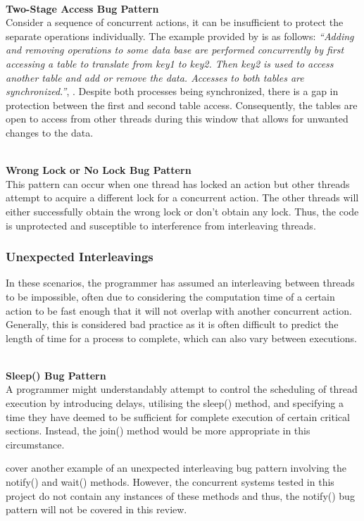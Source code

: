 \documentclass[a4paper,12pt]{article}
\begin{document}
\textbf{\\Two-Stage Access Bug Pattern}
\\Consider a sequence of concurrent actions, it can be insufficient to protect the separate operations individually. The example provided by \citeauthor{farchi03} is as follows: \textit{“Adding and removing operations to some data base are performed concurrently by first accessing a table to translate from key1 to key2. Then key2 is used to access another table and add or remove the data. Accesses to both tables are synchronized.”}, \citep{farchi03}. Despite both processes being synchronized, there is a gap in protection between the first and second table access. Consequently, the tables are open to access from other threads during this window that allows for unwanted changes to the data.

\textbf{\\Wrong Lock or No Lock Bug Pattern}
\\This pattern can occur when one thread has locked an action but other threads attempt to acquire a different lock for a concurrent action. The other threads will either successfully obtain the wrong lock or don’t obtain any lock. Thus, the code is unprotected and susceptible to interference from interleaving threads.


\subsubsection{Unexpected Interleavings}

In these scenarios, the programmer has assumed an interleaving between threads to be impossible, often due to considering the computation time of a certain action to be fast enough that it will not overlap with another concurrent action. Generally, this is considered bad practice as it is often difficult to predict the length of time for a process to complete, which can also vary between executions. 

\textbf{\\Sleep() Bug Pattern}
\\A programmer might understandably attempt to control the scheduling of thread execution by introducing delays, utilising the sleep() method, and specifying a time they have deemed to be sufficient for complete execution of certain critical sections. Instead, the join() method would be more appropriate in this circumstance.

\citeauthor{farchi03} cover another example of an unexpected interleaving bug pattern involving the notify() and wait() methods. However, the concurrent systems tested in this project do not contain any instances of these methods and thus, the notify() bug pattern will not be covered in this review.   
\end{document}
